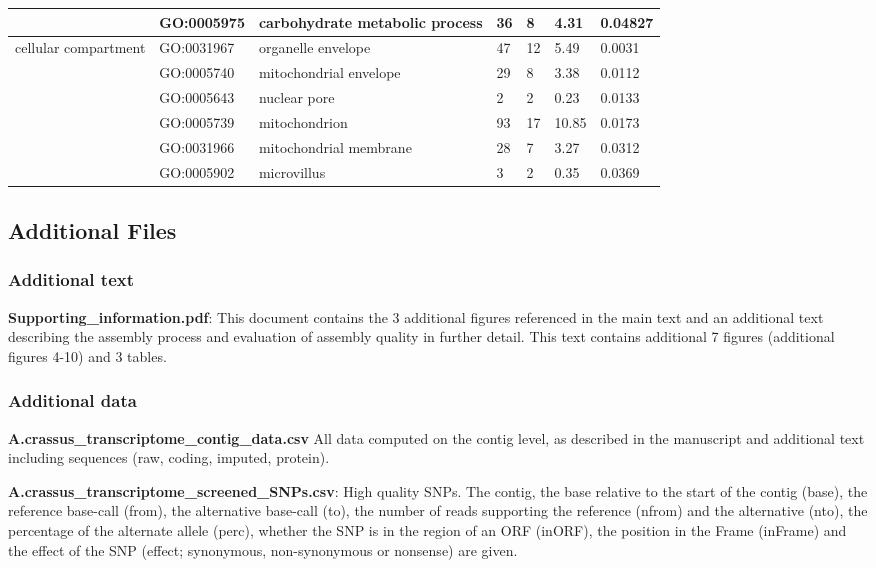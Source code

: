 \documentclass[10pt]{bmc_article}
\newenvironment{bmcformat}{\begin{raggedright}\baselineskip20pt\sloppy\setboolean{publ}{false}}{\end{raggedright}\baselineskip20pt\sloppy}
\begin{document}
\begin{bmcformat}
\begin{longtable}{p{1.7cm}lp{4.5cm}p{1cm}p{1cm}ll}
   & GO:0005975 & carbohydrate metabolic process &  36 &   8 & 4.31 & 0.04827 \\ 
   \hline
cellular compartment & GO:0031967 & organelle envelope &  47 &  12 & 5.49 & 0.0031 \\ 
   & GO:0005740 & mitochondrial envelope &  29 &   8 & 3.38 & 0.0112 \\ 
   & GO:0005643 & nuclear pore &   2 &   2 & 0.23 & 0.0133 \\ 
   & GO:0005739 & mitochondrion &  93 &  17 & 10.85 & 0.0173 \\ 
   & GO:0031966 & mitochondrial membrane &  28 &   7 & 3.27 & 0.0312 \\ 
   & GO:0005902 & microvillus &   3 &   2 & 0.35 & 0.0369 \\ 
   \hline
\hline
\end{longtable}
\normalsize


\subsection*{Additional Files}

\subsubsection*{Additional text}

\textbf{Supporting\_information.pdf}: This document contains the 3
additional figures referenced in the main text and an additional text
describing the assembly process and evaluation of assembly quality in
further detail. This text contains additional 7 figures (additional
figures 4-10) and 3 tables.

\subsubsection*{Additional data}

\textbf{A.crassus\_transcriptome\_contig\_data.csv} All data computed
on the contig level, as described in the manuscript and additional
text including sequences (raw, coding, imputed, protein).

\textbf{A.crassus\_transcriptome\_screened\_SNPs.csv}: High quality
SNPs. The contig, the base relative to the start of the contig (base),
the reference base-call (from), the alternative base-call (to), the
number of reads supporting the reference (nfrom) and the alternative
(nto), the percentage of the alternate allele (perc), whether the SNP
is in the region of an ORF (inORF), the position in the Frame
(inFrame) and the effect of the SNP (effect; synonymous,
non-synonymous or nonsense) are given.


\end{bmcformat}
\end{document}
